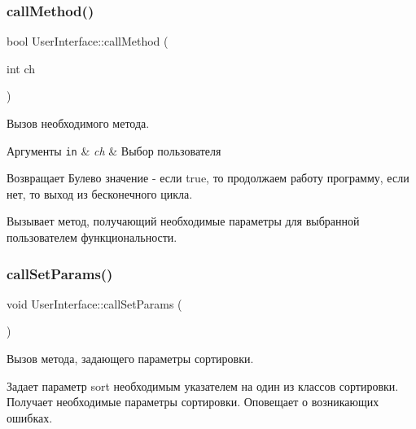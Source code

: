 \subsubsection{\texorpdfstring{call\+Method()}{callMethod()}}
{\footnotesize\ttfamily bool User\+Interface\+::call\+Method (\begin{DoxyParamCaption}\item[{int}]{ch }\end{DoxyParamCaption})\hspace{0.3cm}{\ttfamily [private]}}



Вызов необходимого метода. 


\begin{DoxyParams}[1]{Аргументы}
\mbox{\tt in}  & {\em ch} & Выбор пользователя \\
\hline
\end{DoxyParams}
\begin{DoxyReturn}{Возвращает}
Булево значение -\/ если true, то продолжаем работу программу, если нет, то выход из бесконечного цикла.
\end{DoxyReturn}
Вызывает метод, получающий необходимые параметры для выбранной пользователем функциональности. \hypertarget{class_user_interface_adcabf6c8f2be4b4ec712c4674156bf59}{}\label{class_user_interface_adcabf6c8f2be4b4ec712c4674156bf59} 
\subsubsection{\texorpdfstring{call\+Set\+Params()}{callSetParams()}}
{\footnotesize\ttfamily void User\+Interface\+::call\+Set\+Params (\begin{DoxyParamCaption}{ }\end{DoxyParamCaption})\hspace{0.3cm}{\ttfamily [private]}}



Вызов метода, задающего параметры сортировки. 

Задает параметр sort необходимым указателем на один из классов сортировки. Получает необходимые параметры сортировки. Оповещает о возникающих ошибках. \hypertarget{class_user_interface_a0e03dfecee7e890ad1e076888062d5cb}{}\label{class_user_interface_a0e03dfecee7e890ad1e076888062d5cb} 
